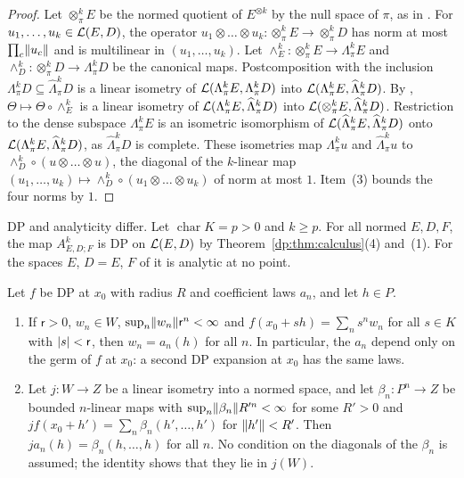 \begin{proof}
Let $\otimes^k_\pi E$ be the normed quotient of $E^{\otimes k}$ by the null space of $\pi$, as in \cite[Section~3.1]{I}. For $u_1,\dots,u_k\in\mathcal L(E,D)$, the operator $u_1\otimes\dots\otimes u_k\colon\otimes^k_\pi E\to\otimes^k_\pi D$ has norm at most $\prod_c\lVert u_c\rVert$ and is multilinear in $(u_1,\dots,u_k)$. Let $\wedge^k_E\colon\otimes^k_\pi E\to\Lambda^k_\pi E$ and $\wedge^k_D\colon\otimes^k_\pi D\to\Lambda^k_\pi D$ be the canonical maps. Postcomposition with the inclusion $\Lambda^k_\pi D\subseteq\widehat\Lambda^k_\pi D$ is a linear isometry of $\mathcal L(\Lambda^k_\pi E,\Lambda^k_\pi D)$ into $\mathcal L(\Lambda^k_\pi E,\widehat\Lambda^k_\pi D)$. By \cite[Lemma~3.7]{I}, $\Theta\mapsto\Theta\circ\wedge^k_E$ is a linear isometry of
$\mathcal L(\Lambda^k_\pi E,\widehat\Lambda^k_\pi D)$ into $\mathcal L(\otimes^k_\pi E,\widehat\Lambda^k_\pi D)$. Restriction to the dense
subspace $\Lambda^k_\pi E$ is an isometric isomorphism of $\mathcal L(\widehat\Lambda^k_\pi E,\widehat\Lambda^k_\pi D)$ onto
$\mathcal L(\Lambda^k_\pi E,\widehat\Lambda^k_\pi D)$, as $\widehat\Lambda^k_\pi D$ is complete. These isometries map
$\Lambda^k_\pi u$ and $\widehat\Lambda^k_\pi u$ to $\wedge^k_D\circ(u\otimes\dots\otimes u)$, the diagonal of the
$k$\nobreakdash-linear map $(u_1,\dots,u_k)\mapsto\wedge^k_D\circ(u_1\otimes\dots\otimes u_k)$ of norm at most $1$. Item~(3)
bounds the four norms by $1$.
\end{proof}

DP and analyticity differ. Let $\operatorname{char}K=p>0$ and $k\ge p$. For all normed $E,D,F$, the map $A^k_{E,D;F}$ is DP on $\mathcal L(E,D)$ by
Theorem~\ref{dp:thm:calculus}(4) and~(1). For the spaces $E$, $D=E$, $F$ of \cite[Theorem~7.2(1)]{I} it is analytic at
no point.

\begin{lemma}\label{dp:lem:coefficients-unique}
Let $f$ be DP at $x_0$ with radius $R$ and coefficient laws $a_n$, and let $h\in P$.
\begin{enumerate}
\item If $\mathsf r>0$, $w_n\in W$, $\sup_n\lVert w_n\rVert\mathsf r^n<\infty$ and $f(x_0+sh)=\sum_ns^nw_n$ for all $s\in K$ with $\lvert s\rvert<\mathsf r$, then $w_n=a_n(h)$ for all $n$. In particular, the $a_n$ depend only on the germ of $f$ at $x_0$: a second DP expansion at $x_0$ has the same laws.
\item Let $j\colon W\to Z$ be a linear isometry into a normed space, and let $\beta_n\colon P^n\to Z$ be bounded $n$\nobreakdash-linear maps with $\sup_n\lVert \beta_n\rVert R'^n<\infty$ for some $R'>0$ and $jf(x_0+h')=\sum_n\beta_n(h',\dots,h')$ for $\lVert h'\rVert<R'$. Then $ja_n(h)=\beta_n(h,\dots,h)$ for all $n$. No condition on the diagonals of the $\beta_n$ is assumed; the identity shows that they lie in $j(W)$.
\end{enumerate}
\end{lemma}

